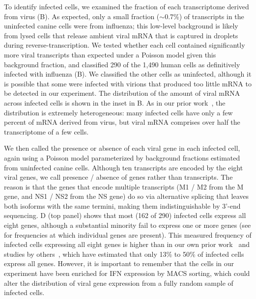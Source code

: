 \documentclass[9pt,lineno]{elife}
\begin{document}
To identify infected cells, we examined the fraction of each transcriptome derived from virus (B).
As expected, only a small fraction ($\sim$0.7\%) of transcripts in the uninfected canine cells were from influenza; this low-level background is likely from lysed cells that release ambient viral mRNA that is captured in droplets during reverse-transcription.
We tested whether each cell contained significantly more viral transcripts than expected under a Poisson model given this background fraction, and classified 290 of the 1,490 human cells as definitively infected with influenza (B).
We classified the other cells as uninfected, although it is possible that some were infected with virions that produced too little mRNA to be detected in our experiment.
The distribution of the amount of viral mRNA across infected cells is shown in the inset in B.
As in our prior work~\citep{russell2018extreme}, the distribution is extremely heterogeneous: many infected cells have only a few percent of mRNA derived from virus, but viral mRNA comprises over half the transcriptome of a few cells.

We then called the presence or absence of each viral gene in each infected cell, again using a Poisson model parameterized by background fractions estimated from uninfected canine cells.
Although ten transcripts are encoded by the eight viral genes, we call presence / absence of genes rather than transcripts.
The reason is that the genes that encode multiple transcripts (M1 / M2 from the M gene, and NS1 / NS2 from the NS gene) do so via alternative splicing that leaves both isoforms with the same termini, making them indistinguishable by 3'-end sequencing.
D (top panel) shows that most (162 of 290) infected cells express all eight genes, although a substantial minority fail to express one or more genes (see  for frequencies at which individual genes are present).
This measured frequency of infected cells expressing all eight genes is higher than in our own prior work~\citep{russell2018extreme} and studies by others~\citep{brooke2013most, heldt2015single, dou2017analysis}, which have estimated that only 13\% to 50\% of infected cells express all genes. 
However, it is important to remember that the cells in our experiment have been enriched for IFN expression by MACS sorting, which could alter the distribution of viral gene expression from a fully random sample of infected cells.
\end{document}

